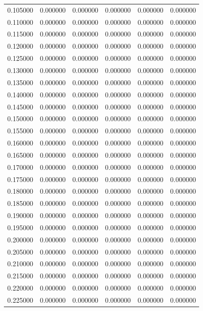 \documentclass[a4paper,twocolumn,11pt,unpublished]{quantumarticle}
\begin{document}
\begin{table}[p]
\begin{tabular}{cccccc}
0.105000 & 0.000000 & 0.000000 & 0.000000 & 0.000000 & 0.000000 \\
0.110000 & 0.000000 & 0.000000 & 0.000000 & 0.000000 & 0.000000 \\
0.115000 & 0.000000 & 0.000000 & 0.000000 & 0.000000 & 0.000000 \\
0.120000 & 0.000000 & 0.000000 & 0.000000 & 0.000000 & 0.000000 \\
0.125000 & 0.000000 & 0.000000 & 0.000000 & 0.000000 & 0.000000 \\
0.130000 & 0.000000 & 0.000000 & 0.000000 & 0.000000 & 0.000000 \\
0.135000 & 0.000000 & 0.000000 & 0.000000 & 0.000000 & 0.000000 \\
0.140000 & 0.000000 & 0.000000 & 0.000000 & 0.000000 & 0.000000 \\
0.145000 & 0.000000 & 0.000000 & 0.000000 & 0.000000 & 0.000000 \\
0.150000 & 0.000000 & 0.000000 & 0.000000 & 0.000000 & 0.000000 \\
0.155000 & 0.000000 & 0.000000 & 0.000000 & 0.000000 & 0.000000 \\
0.160000 & 0.000000 & 0.000000 & 0.000000 & 0.000000 & 0.000000 \\
0.165000 & 0.000000 & 0.000000 & 0.000000 & 0.000000 & 0.000000 \\
0.170000 & 0.000000 & 0.000000 & 0.000000 & 0.000000 & 0.000000 \\
0.175000 & 0.000000 & 0.000000 & 0.000000 & 0.000000 & 0.000000 \\
0.180000 & 0.000000 & 0.000000 & 0.000000 & 0.000000 & 0.000000 \\
0.185000 & 0.000000 & 0.000000 & 0.000000 & 0.000000 & 0.000000 \\
0.190000 & 0.000000 & 0.000000 & 0.000000 & 0.000000 & 0.000000 \\
0.195000 & 0.000000 & 0.000000 & 0.000000 & 0.000000 & 0.000000 \\
0.200000 & 0.000000 & 0.000000 & 0.000000 & 0.000000 & 0.000000 \\
0.205000 & 0.000000 & 0.000000 & 0.000000 & 0.000000 & 0.000000 \\
0.210000 & 0.000000 & 0.000000 & 0.000000 & 0.000000 & 0.000000 \\
0.215000 & 0.000000 & 0.000000 & 0.000000 & 0.000000 & 0.000000 \\
0.220000 & 0.000000 & 0.000000 & 0.000000 & 0.000000 & 0.000000 \\
0.225000 & 0.000000 & 0.000000 & 0.000000 & 0.000000 & 0.000000 \\

\end{tabular}
\end{table}
\end{document}
